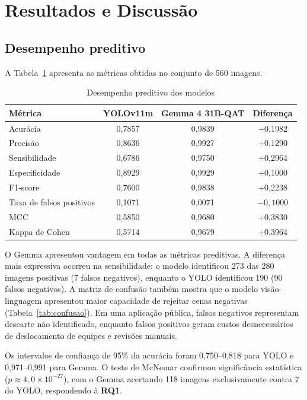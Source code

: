 \documentclass[kdmile,a4paper]{kdmile}
\begin{document}
\section{Resultados e Discussão}
\label{sec:resultados}

\subsection{Desempenho preditivo}
\label{sec:desempenho-preditivo}

A Tabela~\ref{tab:desempenho} apresenta as métricas obtidas no conjunto de 560 imagens.

\begin{table}[htbp]
\centering
\footnotesize
\caption{Desempenho preditivo dos modelos}
\label{tab:desempenho}
\begin{tabular}{lccc}
\toprule
\textbf{Métrica} & \textbf{YOLOv11m} & \textbf{Gemma 4 31B-QAT} & \textbf{Diferença} \\
\midrule
Acurácia & 0,7857 & 0,9839 & +0,1982 \\
Precisão & 0,8636 & 0,9927 & +0,1290 \\
Sensibilidade & 0,6786 & 0,9750 & +0,2964 \\
Especificidade & 0,8929 & 0,9929 & +0,1000 \\
F1-score & 0,7600 & 0,9838 & +0,2238 \\
Taxa de falsos positivos & 0,1071 & 0,0071 & $-0,1000$ \\
MCC & 0,5850 & 0,9680 & +0,3830 \\
Kappa de Cohen & 0,5714 & 0,9679 & +0,3964 \\
\bottomrule
\end{tabular}
\end{table}

O Gemma apresentou vantagem em todas as métricas preditivas. A diferença mais expressiva ocorreu na sensibilidade: o modelo identificou 273 das 280 imagens positivas (7 falsos negativos), enquanto o YOLO identificou 190 (90 falsos negativos). A matriz de confusão também mostra que o modelo visão-linguagem apresentou maior capacidade de rejeitar cenas negativas (Tabela~\ref{tab:confusao}). Em uma aplicação pública, falsos negativos representam descarte não identificado, enquanto falsos positivos geram custos desnecessários de deslocamento de equipes e revisões manuais.

Os intervalos de confiança de 95\% da acurácia foram 0,750--0,818 para YOLO e 0,971--0,991 para Gemma. O teste de McNemar confirmou significância estatística ($p \approx 4,0 \times 10^{-27}$), com o Gemma acertando 118 imagens exclusivamente contra 7 do YOLO, respondendo à \textbf{RQ1}.
\end{document}
